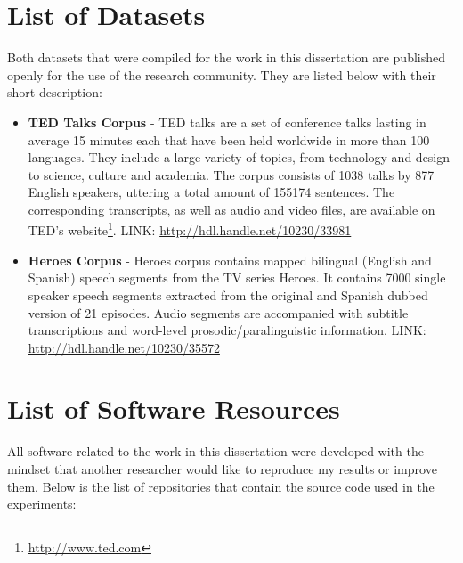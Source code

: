 \section{List of Datasets}
\label{conclusions:datasets}
Both datasets that were compiled for the work in this dissertation are published openly for the use of the research community. They are listed below with their short description:

\begin{itemize}
    \item \textbf{TED Talks Corpus} - TED talks are a set of conference talks lasting in average 15 minutes each that have been held worldwide in more than 100 languages. They include a large variety of topics, from technology and design to science, culture and academia. The corpus consists of 1038 talks by 877 English speakers, uttering a total amount of 155174 sentences. The corresponding transcripts, as well as audio and video files, are available on TED's website\footnote{\url{http://www.ted.com}}. 
    LINK: \url{http://hdl.handle.net/10230/33981}
    
    \item \textbf{Heroes Corpus} - Heroes corpus contains mapped bilingual (English and Spanish) speech segments from the TV series Heroes. It contains 7000 single speaker speech segments extracted from the original and Spanish dubbed version of 21 episodes. Audio segments are accompanied with subtitle transcriptions and word-level prosodic/paralinguistic information.
    LINK: \url{http://hdl.handle.net/10230/35572}
\end{itemize}


\section{List of Software Resources}
\label{conclusions:software}

All software related to the work in this dissertation were developed with the mindset that another researcher would like to reproduce my results or improve them. Below is the list of repositories that contain the source code used in the experiments:

